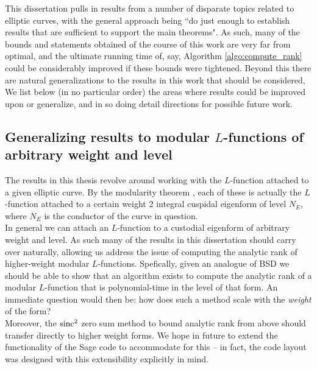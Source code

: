 
This dissertation pulls in results from a number of disparate topics related to elliptic curves, with the general approach being ``do just enough to establish results that are sufficient to support the main theorems". As such, many of the bounds and statements obtained of the course of this work are very far from optimal, and the ultimate running time of, say, Algorithm \ref{algo:compute_rank} could be considerably improved if these bounds were tightened. Beyond this there are natural generalizations to the results in this work that should be considered, We list below (in no particular order) the areas where results could be improved upon or generalize, and in so doing detail directions for possible future work.

\subsection{Generalizing results to modular $L$-functions of arbitrary weight and level}

The results in this thesis revolve around working with the $L$-function attached to a given elliptic curve. By the modularity theorem \cite{BCDT-2011}, each of these is actually the $L$-function attached to a certain weight 2 integral cuspidal eigenform of level $N_E$, where $N_E$ is the conductor of the curve in question. \\

In general we can attach an $L$-function to a custodial eigenform of arbitrary weight and level. As such many of the results in this dissertation should carry over naturally, allowing us address the issue of computing the analytic rank of higher-weight modular $L$-functions. Spefically, given an analogue of BSD we should be able to show that an algorithm exists to compute the analytic rank of a modular $L$-function that is polynomial-time in the level of that form. An immediate question would then be: how does such a method scale with the {\it weight} of the form? \\

Moreover, the $\text{sinc}^2$ zero sum method to bound analytic rank from above should transfer directly to higher weight forms. We hope in future to extend the functionality of the Sage code to accommodate for this -- in fact, the code layout was designed with this extensibility explicitly in mind.


